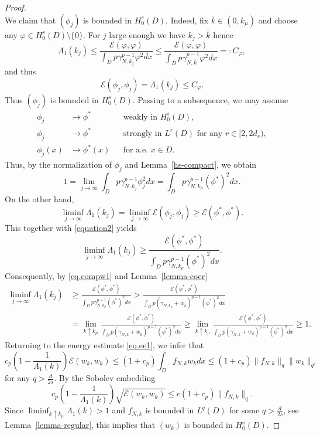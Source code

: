 \documentclass[11pt,a4paper,reqno]{amsart}
\theoremstyle{definition}
\numberwithin{equation}{section}
\begin{document}
\begin{proof}
\[\]
We claim that $(\phi_{j})$ is bounded in $H_{0}^{s}(D)$. Indeed, fix $\overline{k}\in(0,k_\mu)$ 
and choose any $\varphi\in H_{0}^{s}(D)\setminus\{0\}$. For $j$ large enough we have $k_{j}>\overline{k}$ hence
\[
\Lambda_{1}(k_{j})\le\frac{\mathcal{E}(\varphi,\varphi)}{\int_{D}p\gamma_{N,k_{j}}^{p-1}\varphi^{2}dx}
\le\frac{\mathcal{E}(\varphi,\varphi)}{\int_{D}p\gamma_{N,\overline{k}}^{p-1}\varphi^{2}dx}=:C_{\varphi},
\]
and thus
\[
\mathcal{E}(\phi_{j},\phi_{j})=\Lambda_{1}(k_{j})\le C_{\varphi}.
\]
Thus $(\phi_{j})$ is bounded in $H_{0}^{s}(D)$. Passing to a subsequence, we may assume
\begin{align*}
\phi_{j}&\rightarrow\phi^{*} &&\text{weakly in } H_{0}^{s}(D),\\
\phi_{j}&\rightarrow\phi^{*} &&\text{strongly in } L^{r}(D) \text{ for any } r\in[2,2d_s),\\
\phi_{j}(x)&\rightarrow\phi^{*}(x) &&\text{for a.e. } x\in D.
\end{align*}
Thus, by the normalization of $\phi_{j}$ and Lemma~\ref{hs-compact}, we obtain 
\begin{equation}
 \label{equation2}
1=\lim_{j\to \infty}\int_{D}p\gamma_{N,k_{j}}^{p-1}\phi_{j}^{2}dx= \int_{D}p\gamma_{N,k_\mu}^{p-1}(\phi^{*})^{2}dx.
\end{equation}
On the other hand,
\[
\liminf_{j\rightarrow\infty}\Lambda_{1}(k_{j})=\liminf_{j\rightarrow\infty}\mathcal{E}(\phi_{j},\phi_{j})\ge\mathcal{E}(\phi^{*},\phi^{*}).
\]
This together with \eqref{equation2}  yields
\[
\liminf_{j\rightarrow\infty}\Lambda_{1}(k_{j})\ge\frac{\mathcal{E}(\phi^{*},\phi^{*})}{\int_{D}p\gamma_{N,k_\mu}^{p-1}(\phi^{*})^{2}dx}.
\]
Consequently, by \eqref{eq.compw1} and Lemma~\ref{lemma-coer} 
\begin{align*}
\liminf_{j\rightarrow\infty}\Lambda_{1}(k_{j})&\ge\frac{\mathcal{E}(\phi^{*},\phi^{*})}{\int_{D}p\gamma_{N,k_\mu}^{p-1}(\phi^{*})^{2}dx}
>\frac{\mathcal{E}(\phi^{*},\phi^{*})}{\int_{D}p(\gamma_{N,k_\mu}+w_{\overline{k}})^{p-1}(\phi^{*})^{2}dx}\\
&=\lim_{k\uparrow k_\mu}\frac{\mathcal{E}(\phi^{*},\phi^{*})}{\int_{D}p(\gamma_{N,k}+w_{\overline{k}})^{p-1}(\phi^{*})^{2}dx}
\ge\lim_{k\uparrow k_\mu}\frac{\mathcal{E}(\phi^{*},\phi^{*})}{\int_{D}p(\gamma_{N,k}+w_{k})^{p-1}(\phi^{*})^{2}dx}\ge1.
\end{align*}
Returning to the energy estimate \eqref{eq.ee1}, we infer that
\[
c_p \left(1-\frac{1}{\Lambda_1(k)} \right) \mathcal E(w_k,w_k) \le (1+c_p) \int_D f_{N,k} w_k dx \le (1+c_p) \|f_{N,k}\|_q \|w_k\|_{q'}
\]
for any $q>\frac{d}{2s}$. By the Sobolev embedding
\[
c_p \left( 1 - \frac{1}{\Lambda_1(k)} \right) \sqrt{\mathcal E(w_k,w_k)}  \le c(1+c_p) \|f_{N,k}\|_q.
\]
Since $\liminf_{k \uparrow k_\mu} \Lambda_1(k) > 1$ and $f_{N,k}$ is  bounded in $L^q(D)$ for some $q > \frac{d}{2s}$,
see Lemma~\ref{lemma-regular}, this implies that $(w_k)$ is  bounded in $H_0^s(D)$.
\end{proof}
\end{document}
